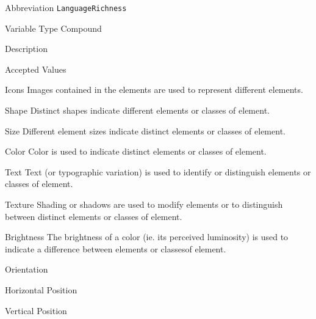 \begin{AlignedDesc}
  \item[Abbreviation] \texttt{LanguageRichness}

  \item[Variable Type] Compound

  \item[Description]

  \item[Accepted Values]

  \begin{AlignedDesc}
    \item[Icons] Images contained in the elements are used to represent different elements. \cite{costagliola2002,moody2009}
    \item[Shape] Distinct shapes indicate different elements or classes of element. \cite{moody2009}
    \item[Size] Different element sizes indicate distinct elements or classes of element. \cite{moody2009}
    \item[Color] Color is used to indicate distinct elements or classes of element. \cite{moody2009}
    \item[Text] Text (or typographic variation) is used to identify or distinguish elements or classes of element. \cite{moody2009}
    \item[Texture] Shading or shadows are used to modify elements or to distinguish between distinct elements or classes of element. \cite{moody2009}
    \item[Brightness] The brightness of a color (ie. its perceived luminosity) is used to indicate a difference between elements or classesof element. \cite{moody2009}
    \item[Orientation]
    \item[Horizontal Position]
    \item[Vertical Position]
  \end{AlignedDesc}

\end{AlignedDesc}


